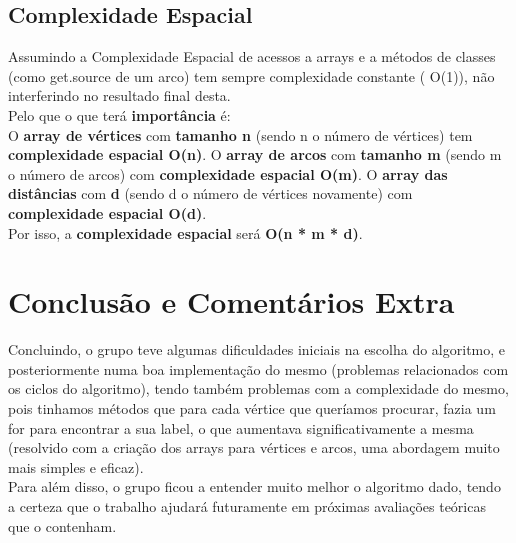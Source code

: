 \documentclass[11pt]{article}   %
\begin{document}
\subsection{Complexidade Espacial}
\hspace{0,5cm}Assumindo a Complexidade Espacial de acessos a arrays e a métodos de classes (como get.source de um arco) tem sempre complexidade constante ( O(1)), não interferindo no resultado final desta.\\

Pelo que o que terá \textbf{importância} é:\\
O \textbf{array de vértices} com \textbf{tamanho n} (sendo n o número de vértices) tem \textbf{complexidade espacial O(n)}.
O \textbf{array de arcos} com \textbf{tamanho m} (sendo m o número de arcos) com \textbf{complexidade espacial O(m)}.
O \textbf{array das distâncias} com \textbf{\tamanho d} (sendo d o número de vértices novamente) com \textbf{complexidade espacial O(d)}.\\

Por isso, a \textbf{complexidade espacial} será \textbf{O(n * m * d)}.
\newpage
\section{Conclusão e Comentários Extra}
\hspace{0,5cm}Concluindo, o grupo teve algumas dificuldades iniciais na escolha do algoritmo, e posteriormente numa boa implementação do mesmo (problemas relacionados com os ciclos do algoritmo), tendo também problemas com a complexidade do mesmo, pois tinhamos métodos que para cada vértice que queríamos procurar, fazia um for para encontrar a sua label, o que aumentava significativamente a mesma (resolvido com a criação dos arrays para vértices e arcos, uma abordagem muito mais simples e eficaz).\\

Para além disso, o grupo ficou a entender muito melhor o algoritmo dado, tendo a certeza que o trabalho ajudará futuramente em próximas avaliações teóricas que o contenham.
\end{document}
